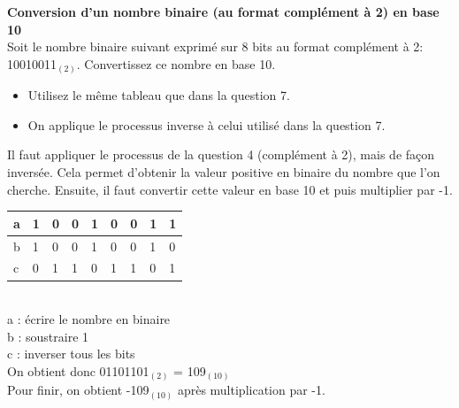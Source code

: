 \newpage
\begin{Exercice}[5 minutes] \textbf{Conversion d'un nombre binaire (au format complément à 2) en base 10 \optionnel}\\
    
    Soit le nombre binaire suivant exprimé sur 8 bits au format complément à 2: 10010011$_{(2)}$. Convertissez ce nombre en base 10. \\
	
    \begin{conseil}
    
    \begin{itemize}
    	\item Utilisez le même tableau que dans la question 7.
    	\item On applique le processus inverse à celui utilisé dans la question 7. 
    \end{itemize}
    
    \end{conseil}
    
    \begin{solution}
       Il faut appliquer le processus de la question 4 (complément à 2), mais de façon inversée. Cela permet d'obtenir la valeur positive en binaire du nombre que l'on cherche. Ensuite, il faut convertir cette valeur en base 10 et puis multiplier par -1. \\
       
       \begin{tabular}{| p{1cm} | p{1cm} | p{1cm} | p{1cm} | p{1cm} | p{1cm} | p{1cm} | p{1cm} | p{1cm} |} 
            \hline
            a & 1 & 0 & 0 & 1 & 0 & 0 & 1 & 1 \\ [0.5ex] 
            \hline
            b & 1 & 0 & 0 & 1 & 0 & 0 & 1 & 0 \\ [0.5ex]
            \hline
            c & 0 & 1 & 1 & 0 & 1 & 1 & 0 & 1 \\ [0.5ex]
            \hline
        \end{tabular} \\
        
        a : écrire le nombre en binaire \\
        
        b : soustraire 1 \\
        
        c : inverser tous les bits \\
        
        On obtient donc 01101101$_{(2)}$ = 109$_{(10)}$ \\
        
        Pour finir, on obtient -109$_{(10)}$ après multiplication par -1.
       
    \end{solution}
\end{Exercice}

